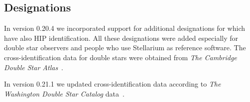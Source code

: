 \subsection{Designations}
\label{sec:StarCatalogues:DoubleStars:Designations}

In version 0.20.4 we incorporated support for additional designations 
for  which have also HIP identification. All these designations 
were added especially for double star observers and people who use Stellarium as 
reference software. The cross-identification data for double stars were obtained 
from \emph{The Cambridge Double Star Atlas}~\citep{2009cdsa.book, 2015cdsa.book.....M}.

In version 0.21.1 we updated cross-identification data according to \emph{The Washington Double Star Catalog} data~\citep{2001AJ....122.3466M}.

